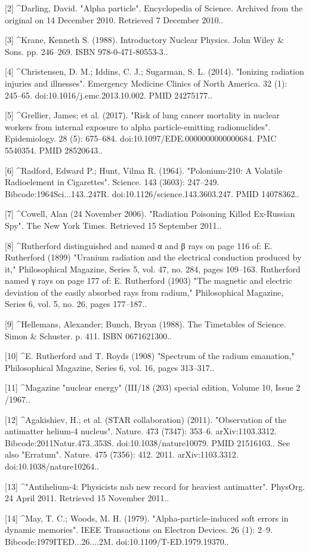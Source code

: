 [2]
^Darling, David. "Alpha particle". Encyclopedia of Science. Archived from the original on 14 December 2010. Retrieved 7 December 2010..

[3]
^Krane, Kenneth S. (1988). Introductory Nuclear Physics. John Wiley & Sons. pp. 246–269. ISBN 978-0-471-80553-3..

[4]
^Christensen, D. M.; Iddins, C. J.; Sugarman, S. L. (2014). "Ionizing radiation injuries and illnesses". Emergency Medicine Clinics of North America. 32 (1): 245–65. doi:10.1016/j.emc.2013.10.002. PMID 24275177..

[5]
^Grellier, James; et al. (2017). "Risk of lung cancer mortality in nuclear workers from internal exposure to alpha particle-emitting radionuclides". Epidemiology. 28 (5): 675–684. doi:10.1097/EDE.0000000000000684. PMC 5540354. PMID 28520643..

[6]
^Radford, Edward P.; Hunt, Vilma R. (1964). "Polonium-210: A Volatile Radioelement in Cigarettes". Science. 143 (3603): 247–249. Bibcode:1964Sci...143..247R. doi:10.1126/science.143.3603.247. PMID 14078362..

[7]
^Cowell, Alan (24 November 2006). "Radiation Poisoning Killed Ex-Russian Spy". The New York Times. Retrieved 15 September 2011..

[8]
^Rutherford distinguished and named α and β rays on page 116 of: E. Rutherford (1899) "Uranium radiation and the electrical conduction produced by it," Philosophical Magazine, Series 5, vol. 47, no. 284, pages 109–163. Rutherford named γ rays on page 177 of: E. Rutherford (1903) "The magnetic and electric deviation of the easily absorbed rays from radium," Philosophical Magazine, Series 6, vol. 5, no. 26, pages 177–187..

[9]
^Hellemans, Alexander; Bunch, Bryan (1988). The Timetables of Science. Simon & Schuster. p. 411. ISBN 0671621300..

[10]
^E. Rutherford and T. Royds (1908) "Spectrum of the radium emanation," Philosophical Magazine, Series 6, vol. 16, pages 313–317..

[11]
^Magazine "nuclear energy" (III/18 (203) special edition, Volume 10, Issue 2 /1967..

[12]
^Agakishiev, H.; et al. (STAR collaboration) (2011). "Observation of the antimatter helium-4 nucleus". Nature. 473 (7347): 353–6. arXiv:1103.3312. Bibcode:2011Natur.473..353S. doi:10.1038/nature10079. PMID 21516103.. See also "Erratum". Nature. 475 (7356): 412. 2011. arXiv:1103.3312. doi:10.1038/nature10264..

[13]
^"Antihelium-4: Physicists nab new record for heaviest antimatter". PhysOrg. 24 April 2011. Retrieved 15 November 2011..

[14]
^May, T. C.; Woods, M. H. (1979). "Alpha-particle-induced soft errors in dynamic memories". IEEE Transactions on Electron Devices. 26 (1): 2–9. Bibcode:1979ITED...26....2M. doi:10.1109/T-ED.1979.19370..